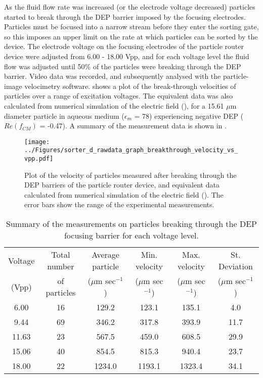 As the fluid flow rate was increased (or the electrode voltage decreased) particles started to break through the DEP barrier imposed by the focusing electrodes. Particles must be focused into a narrow stream before they enter the sorting gate, so this imposes an upper limit on the rate at which particles can be sorted by the device. The electrode voltage on the focusing electrodes of the particle router device were adjusted from 6.00 - 18.00 Vpp, and for each voltage level the fluid flow was adjusted until 50\% of the particles were breaking through the DEP barrier. Video data was recorded, and subsequently analysed with the particle-image velocimetry software.  shows a plot of the break-through velocities of particles over a range of excitation voltages. The equivalent data was also calculated from numerical simulation of the electric field (), for a 15.61 $\mu$m diameter particle in aqueous medium ($\epsilon_{m}$ = 78) experiencing negative DEP ($Re(f_{CM})$ = -0.47). A summary of the measurement data is shown in .


\begin{figure}
 \centering
 \texttt{[image: ../Figures/sorter\_d\_rawdata\_graph\_breakthrough\_velocity\_vs\_vpp.pdf]}
 \caption[Plot of the velocity of particles breaking through a DEP barrier.]{Plot of the velocity of particles measured after breaking through the DEP barriers of the particle router device, and equivalent data calculated from numerical simulation of the electric field (). The error bars show the range of the experimental measurements.}
 \label{fig:sorter_d_rawdata_graph_breakthrough_velocity_vs_vpp}
\end{figure}

\begin{table}[b]
	\centering
		\begin{tabular} {c c c c c c}
		\hline
		Voltage	&	Total number & Average particle & Min. velocity & Max. velocity & St. Deviation \\
		(Vpp)	& of particles & ($\mu$m sec$^{-1}$)	& ($\mu$m sec$^{-1}$) & ($\mu$m sec$^{-1}$) & ($\mu$m sec$^{-1}$) \\
		\hline
		6.00	&	16 & 129.2 & 123.1 &	135.1 &	4.0 \\
		9.44	&	69 & 346.2 & 317.8 &	393.9 &	11.7 \\
		11.63	&	23 & 567.5 & 459.0 &	608.5 &	29.9 \\
		15.06	&	40 & 854.5 & 815.3 &	940.4 &	23.7 \\
		18.00	&	22 & 1234.0 & 1193.1 &	1323.4 &	34.1 \\
		\hline			
		\end{tabular}
	\caption[Summary of the measurements on particles breaking through the DEP focusing barrier.]{Summary of the measurements on particles breaking through the DEP focusing barrier for each voltage level.}
	\label{tab:breakthrough_testing_number_of_particles}
\end{table}


